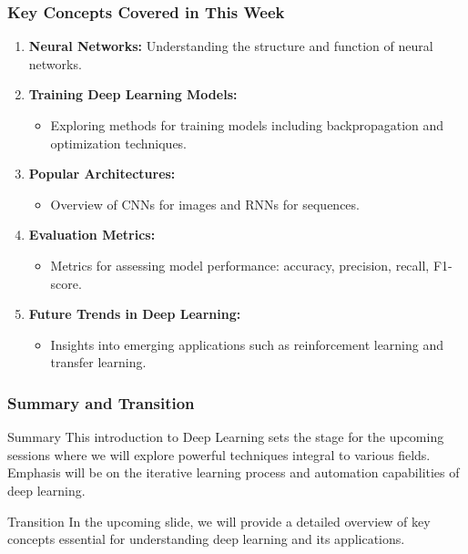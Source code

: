 \documentclass[aspectratio=169]{beamer}
\begin{document}
\begin{frame}[fragile]
    \frametitle{Key Concepts Covered in This Week}
    \begin{enumerate}
        \item \textbf{Neural Networks:} Understanding the structure and function of neural networks.
        \item \textbf{Training Deep Learning Models:} 
            \begin{itemize}
                \item Exploring methods for training models including backpropagation and optimization techniques.
            \end{itemize}
        \item \textbf{Popular Architectures:} 
            \begin{itemize}
                \item Overview of CNNs for images and RNNs for sequences.
            \end{itemize}
        \item \textbf{Evaluation Metrics:} 
            \begin{itemize}
                \item Metrics for assessing model performance: accuracy, precision, recall, F1-score.
            \end{itemize}
        \item \textbf{Future Trends in Deep Learning:} 
            \begin{itemize}
                \item Insights into emerging applications such as reinforcement learning and transfer learning.
            \end{itemize}
    \end{enumerate}
\end{frame}

\begin{frame}[fragile]
    \frametitle{Summary and Transition}
    \begin{block}{Summary}
        This introduction to Deep Learning sets the stage for the upcoming sessions where we will explore powerful techniques integral to various fields. Emphasis will be on the iterative learning process and automation capabilities of deep learning.
    \end{block}
    
    \begin{block}{Transition}
        In the upcoming slide, we will provide a detailed overview of key concepts essential for understanding deep learning and its applications.
    \end{block}
\end{frame}
\end{document}

